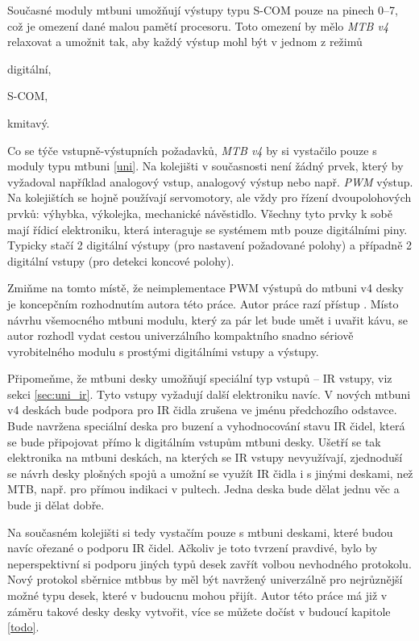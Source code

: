 Současné moduly \gls{mtbuni} umožňují výstupy typu S-COM pouze na pinech
0–7, což je omezení dané malou pamětí procesoru. Toto omezení by mělo
\textit{MTB v4} relaxovat a umožnit tak, aby každý výstup mohl být v jednom
z režimů

\begin{compactenum}
\item digitální,
\item S-COM,
\item kmitavý.
\end{compactenum}

Co se týče vstupně-výstupních požadavků, \textit{MTB v4} by si vystačilo pouze
s moduly typu \gls{mtbuni} \ref{uni}. Na kolejišti v současnosti není žádný
prvek, který by vyžadoval například analogový vstup, analogový výstup nebo např.
\textit{PWM} výstup. Na kolejištích se hojně používají servomotory, ale vždy
pro řízení dvoupolohových prvků: výhybka, výkolejka, mechanické návěstidlo.
Všechny tyto prvky k sobě mají řídicí elektroniku, která interaguje se systémem
\gls{mtb} pouze digitálními piny. Typicky stačí 2 digitální výstupy (pro
nastavení požadované polohy) a případně 2 digitální vstupy (pro detekci koncové
polohy).

Zmiňme na tomto místě, že neimplementace PWM výstupů do \gls{mtbuni} v4
desky je koncepčním rozhodnutím autora této práce. Autor práce razí přístup
. Místo návrhu všemocného
\gls{mtbuni} modulu, který za pár let bude umět i uvařit kávu, se autor
rozhodl vydat cestou univerzálního kompaktního snadno sériově vyrobitelného
modulu s prostými digitálními vstupy a výstupy.

Připomeňme, že \gls{mtbuni} desky umožňují speciální typ vstupů – IR vstupy,
viz sekci \ref{sec:uni_ir}. Tyto vstupy vyžadují další elektroniku navíc.
V nových \gls{mtbuni} v4 deskách bude podpora pro IR čidla zrušena ve jménu
předchozího odstavce. Bude navržena speciální deska pro buzení a vyhodnocování
stavu IR čidel, která se bude připojovat přímo k digitálním vstupům
\gls{mtbuni} desky. Ušetří se tak elektronika na \gls{mtbuni} deskách,
na kterých se IR vstupy nevyužívají, zjednoduší se návrh desky plošných spojů
a umožní se využít IR čidla i s jinými deskami, než MTB, např. pro přímou
indikaci v pultech. Jedna deska bude dělat jednu věc a bude ji dělat dobře.

Na současném kolejišti si tedy vystačím pouze s \gls{mtbuni} deskami, které
budou navíc ořezané o podporu IR čidel. Ačkoliv je toto tvrzení pravdivé, bylo
by neperspektivní si podporu jiných typů desek zavřít volbou nevhodného
protokolu. Nový protokol sběrnice \gls{mtbbus} by měl být navržený univerzálně
pro nejrůznější možné typu desek, které v budoucnu mohou přijít. Autor této
práce má již v záměru takové desky desky vytvořit, více se můžete dočíst
v budoucí kapitole \ref{todo}.

